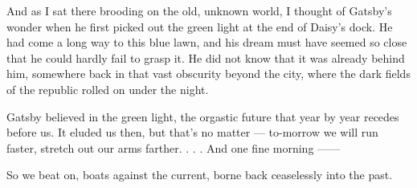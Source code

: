 \documentclass{znotebook}
\begin{document}
And as I sat there brooding on the old, unknown world, I thought of Gatsby's wonder when he first picked out the green light at the end of Daisy's dock. He had come a long way to this blue lawn, and his dream must have seemed so close that he could hardly fail to grasp it. He did not know that it was already behind him, somewhere back in that vast obscurity beyond the city, where the dark fields of the republic rolled on under the night.

Gatsby believed in the green light, the orgastic future that year by year recedes before us. It eluded us then, but that's no matter — to-morrow we will run faster, stretch out our arms farther. . . . And one fine morning ——

So we beat on, boats against the current, borne back ceaselessly into the past.
\end{document}
